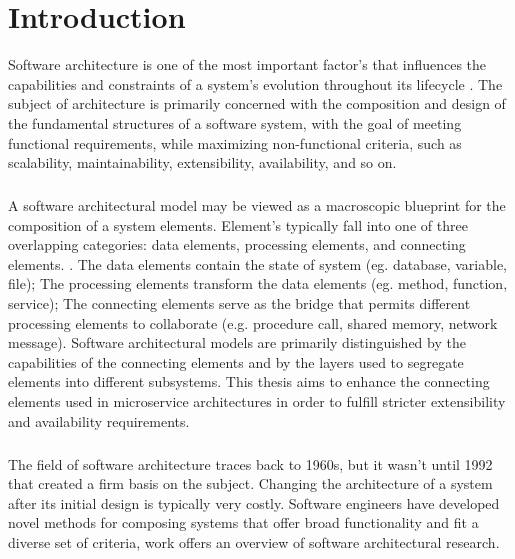 
%

\chapter{Introduction}
\label{cha:introduction}

Software architecture is one of the most important factor's that influences the capabilities and constraints of a system's evolution throughout its lifecycle \cite{Breivold2012}.
The subject of architecture is primarily concerned with the composition and design of the fundamental structures of a software system,
with the goal of meeting functional requirements, while maximizing non-functional criteria, such as scalability, maintainability, extensibility, availability, and so on.

\paragraph{}

A software architectural model may be viewed as a macroscopic blueprint for the composition of a system elements.
Element's typically fall into one of three overlapping categories: data elements, processing elements, and connecting elements. \cite{architecture}.
The data elements contain the state of system (eg. database, variable, file);
The processing elements transform the data elements (eg. method, function, service);
The connecting elements serve as the bridge that permits different processing elements to collaborate (e.g. procedure call, shared memory, network message).
Software architectural models are primarily distinguished by the capabilities of the connecting elements and by the layers used to segregate elements into different subsystems.
This thesis aims to enhance the connecting elements used in microservice architectures in order to fulfill stricter extensibility and availability requirements.

\paragraph{}

The field of software architecture traces back to 1960s, but it wasn't until 1992 that \citeauthor{architecture} \cite{architecture} created a firm basis on the subject.
Changing the architecture of a system after its initial design is typically very costly.
Software engineers have developed novel methods for composing systems that offer broad functionality and fit a diverse set of criteria, \citeauthor{3} work \cite{3, 4} offers an overview of software architectural research.

